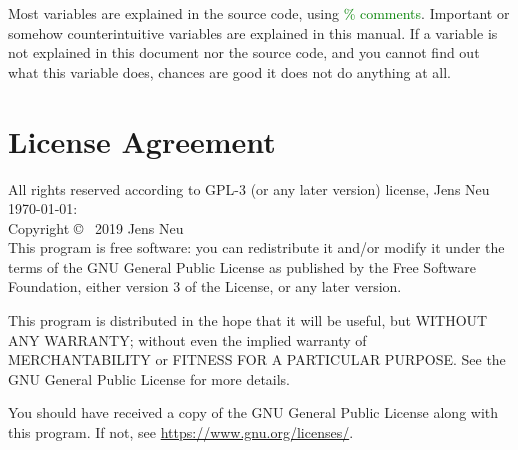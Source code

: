 \documentclass[12pt]{article}
\begin{document}
Most variables are explained in the source code, using \textcolor{green}{\% comments}. Important or somehow counterintuitive variables are explained in this manual. If a variable is not explained in this document nor the source code, and you cannot find out what this variable does, chances are good it does not do anything at all. 



\section{License Agreement} 
All rights reserved according to GPL-3 (or any later version) license, Jens Neu \today: \\
    Copyright \copyright~ 2019  Jens Neu \\
    This program is free software: you can redistribute it and/or modify
    it under the terms of the GNU General Public License as published by
    the Free Software Foundation, either version 3 of the License, or
any later version.

    This program is distributed in the hope that it will be useful,
    but WITHOUT ANY WARRANTY; without even the implied warranty of
    MERCHANTABILITY or FITNESS FOR A PARTICULAR PURPOSE.  See the
    GNU General Public License for more details.

    You should have received a copy of the GNU General Public License
    along with this program.  If not, see \href{https://www.gnu.org/licenses/}{https://www.gnu.org/licenses/}.
\end{document}
